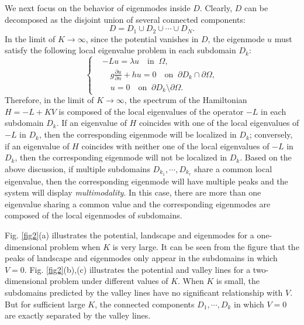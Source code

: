 \documentclass[a4paper,11pt]{article}
\begin{document}
We next focus on the behavior of eigenmodes inside $D$. Clearly, $D$ can be decomposed as the disjoint union of several connected components:
\begin{equation*}
D = D_1 \cup D_2 \cup \cdots \cup D_N.
\end{equation*}
In the limit of $K\rightarrow\infty$, since the potential vanishes in $D$, the eigenmode $u$ must satisfy the following local eigenvalue problem in each subdomain $D_k$:
\begin{equation}\label{subdomain}
\left\{
\begin{split}
& - L u = \lambda u \quad \textrm{in}\;\;\Omega, \\
& \quad g \frac{\partial u}{\partial n} + h u = 0 \quad \textrm{on}\;\;\partial D_k \cap \partial \Omega, \\
& \quad u = 0 \quad \textrm{on}\;\;\partial D_k \setminus \partial \Omega.
\end{split}
\right.
\end{equation}
Therefore, in the limit of $K \rightarrow \infty$, the spectrum of the Hamiltonian $H = - L + K V$ is composed of the local eigenvalues of the operator $-L$ in each subdomain $D_k$. If an eigenvalue of $H$ coincides with one of the local eigenvalues of $-L$ in $D_k$, then the corresponding eigenmode will be localized in $D_k$; conversely, if an eigenvalue of $H$ coincides with neither one of the local eigenvalues of $-L$ in $D_k$, then the corresponding eigenmode will not be localized in $D_k$. Based on the above discussion, if multiple subdomains $D_{k_1}, \cdots , D_{k_r}$ share a common local eigenvalue, then the corresponding eigenmode will have multiple peaks and the system will display \emph{multimodality}. In this case, there are more than one eigenvalue sharing a common value and the corresponding eigenmodes are composed of the local eigenmodes of subdomains.

Fig. \ref{fig2}(a) illustrates the potential, landscape and eigenmodes for a one-dimensional problem when $K$ is very large. It can be seen from the figure that the peaks of landscape and eigenmodes only appear in the subdomains in which $V = 0$. Fig. \ref{fig2}(b),(c) illustrates the potential and valley lines for a two-dimensional problem under different values of $K$. When $K$ is small, the subdomains predicted by the valley lines have no significant relationship with $V$. But for sufficient large $K$, the connected components $D_1, \cdots, D_k$ in which $V = 0$ are exactly separated by the valley lines. 
\end{document}

